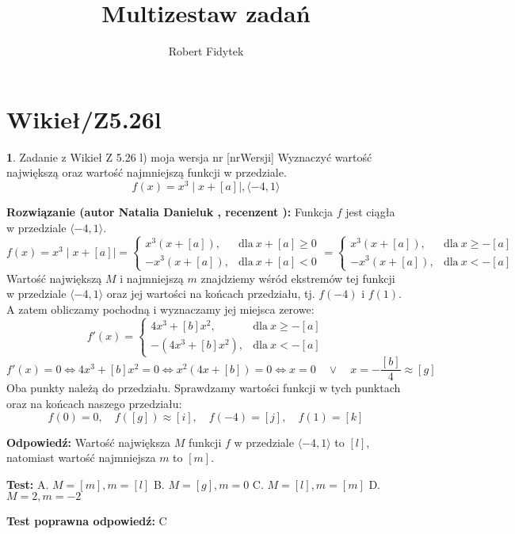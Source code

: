 \documentclass[12pt, a4paper]{article}
\title{Multizestaw zadań}
\author{Robert Fidytek}
\date{}
\theoremstyle{definition} %
\newtheorem{zad}{}
\newcommand{\kategoria}[1]{\section{#1}} %
\newcommand{\zadStart}[1]{\begin{zad}#1\newline} %
\newcommand{\zadStop}{\end{zad}}   %
\newcommand{\rozwStart}[2]{\noindent \textbf{Rozwiązanie (autor #1 , recenzent #2): }\newline} %
\newcommand{\rozwStop}{\newline}                                            %
\newcommand{\odpStart}{\noindent \textbf{Odpowiedź:}\newline}    %
\newcommand{\odpStop}{\newline}                                             %
\newcommand{\testStart}{\noindent \textbf{Test:}\newline} %
\newcommand{\testStop}{\newline} %
\newcommand{\kluczStart}{\noindent \textbf{Test poprawna odpowiedź:}\newline} %
\newcommand{\kluczStop}{\newline} %
\begin{document}
\maketitle

\kategoria{Wikieł/Z5.26l}

\zadStart{Zadanie z Wikieł Z 5.26 l) moja wersja nr [nrWersji]}
Wyznaczyć wartość największą oraz wartość najmniejszą funkcji w przedziale. 
$$f(x) = x^3\mid x + [a] \mid, \langle-4,1\rangle$$
\zadStop

\rozwStart{Natalia Danieluk}{}
Funkcja $f$ jest ciągła w przedziale $\langle-4,1\rangle$. 
$$ f(x) = x^3\mid x + [a] \mid =  
\begin{cases} 
x^3(x + [a]), & \text{dla} \ x + [a] \ge 0 \\
- x^3(x + [a]), & \text{dla}\ x + [a] < 0
\end{cases} 
=  
\begin{cases} 
x^3(x + [a]), & \text{dla} \ x \ge - [a] \\
- x^3(x + [a]), & \text{dla}\ x < - [a]
\end{cases} 
$$
Wartość największą $M$ i najmniejszą $m$ znajdziemy wśród ekstremów tej funkcji w przedziale $\langle-4,1\rangle$ oraz jej wartości na końcach przedziału, tj. $f(-4)$ i $f(1)$. \\
A zatem obliczamy pochodną i wyznaczamy jej miejsca zerowe:
$$ f'(x) = 
\begin{cases} 
4x^3 + [b]x^2, & \text{dla} \ x \ge - [a] \\
- (4x^3 + [b]x^2), & \text{dla}\ x < - [a]
\end{cases} 
$$
$$ f'(x) = 0 \Leftrightarrow 4x^3 + [b]x^2 = 0 \Leftrightarrow x^2(4x + [b]) = 0 \Leftrightarrow x = 0 \quad \lor \quad x = -\frac{[b]}{4} \approx [g] $$ 
Oba punkty należą do przedziału. Sprawdzamy wartości funkcji w tych punktach oraz na końcach naszego przedziału: \\
$$ f(0) = 0,\quad f([g]) \approx [i],\quad f(-4) = [j],\quad f(1) = [k] $$
\rozwStop
\rozwStop

\odpStart
Wartość największa $M$ funkcji $f$ w przedziale $\langle-4,1\rangle$ to $[l]$, natomiast wartość najmniejsza $m$ to $[m]$.
\odpStop

\testStart
A. $M=[m], m=[l]$
B. $M=[g], m=0$
C. $M=[l], m=[m]$
D. $M=2, m=-2$
\testStop

\kluczStart
C
\kluczStop
\end{document}
